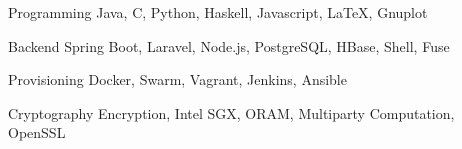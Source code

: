 

\begin{cvskills}

  \cvskill
    {Programming} %
    {Java, C, Python, Haskell, Javascript, LaTeX, Gnuplot} %

  \cvskill
    {Backend} %
    {Spring Boot, Laravel, Node.js, PostgreSQL, HBase, Shell, Fuse} %

  \cvskill
    {Provisioning} %
    {Docker, Swarm, Vagrant, Jenkins, Ansible} %

  \cvskill
    {Cryptography} %
    {Encryption, Intel SGX, ORAM, Multiparty Computation, OpenSSL} %


\end{cvskills}
